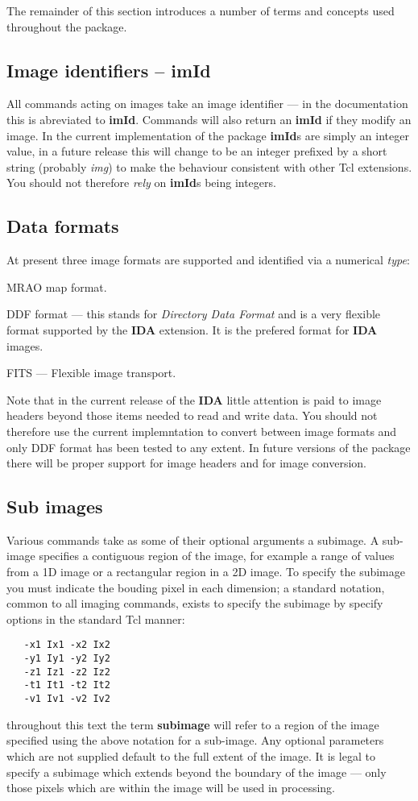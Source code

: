 The remainder of this section introduces a number of terms and concepts used
throughout the package.

\subsection{Image identifiers -- imId}

All commands acting on images take an image identifier --- in the
documentation this is abreviated to {\bf imId}.  Commands will also
return an {\bf imId} if they modify an image.
In the current implementation of the package {\bf imId}s are simply
an integer  value, in a future release this will change to be an integer
prefixed by a short string (probably {\it img}) to make the behaviour consistent
with other Tcl extensions.  You should not therefore {\it rely} on
{\bf imId}s being integers.

\subsection{Data formats}
At present three image formats are supported and
identified via a numerical {\it type}:
\begin{npars}
\item MRAO map format.
\item DDF format --- this stands for {\it Directory Data Format} and is
a very flexible format supported by the {\bf IDA} extension.  It is the
prefered format for {\bf IDA} images.
\item FITS --- Flexible image transport.
\end{npars}

Note that in the current release of the {\bf IDA} little
attention is paid to image headers beyond those items needed to read and
write data.  You should not therefore use the current implemntation to
convert between image formats and only DDF format has been tested to
any extent.  In future versions of the package there will be proper
support for image headers and for image conversion.

\subsection{Sub images}
Various commands take as some of their optional arguments a subimage.
A sub-image specifies a contiguous region of the image, for example
a range of values from a 1D image or a rectangular region in a 2D image.  
To specify the subimage you must indicate the bouding pixel in each dimension;
a standard notation, common to all imaging commands, exists to specify the
subimage by specify options in the standard Tcl manner:
\begin{verbatim}
   -x1 Ix1 -x2 Ix2 
   -y1 Iy1 -y2 Iy2 
   -z1 Iz1 -z2 Iz2 
   -t1 It1 -t2 It2 
   -v1 Iv1 -v2 Iv2
\end{verbatim}
throughout this text the term {\bf subimage} will refer to a region of the
image specified using the above notation for a sub-image.
Any optional parameters which are not supplied default to the full extent of the
image.  It is legal to specify a subimage which extends beyond the
boundary of the image --- only those pixels which are within the image
will be used in processing.

